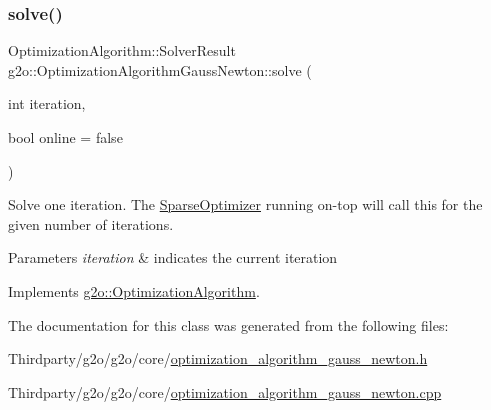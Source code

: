\subsubsection{\texorpdfstring{solve()}{solve()}}
{\footnotesize\ttfamily Optimization\+Algorithm\+::\+Solver\+Result g2o\+::\+Optimization\+Algorithm\+Gauss\+Newton\+::solve (\begin{DoxyParamCaption}\item[{int}]{iteration,  }\item[{bool}]{online = {\ttfamily false} }\end{DoxyParamCaption})\hspace{0.3cm}{\ttfamily [virtual]}}

Solve one iteration. The \mbox{\hyperlink{classg2o_1_1_sparse_optimizer}{Sparse\+Optimizer}} running on-\/top will call this for the given number of iterations. 
\begin{DoxyParams}{Parameters}
{\em iteration} & indicates the current iteration \\
\hline
\end{DoxyParams}


Implements \mbox{\hyperlink{classg2o_1_1_optimization_algorithm_ab174deeeb2551ceaf715ea09f0f9c077}{g2o\+::\+Optimization\+Algorithm}}.



The documentation for this class was generated from the following files\+:\begin{DoxyCompactItemize}
\item 
Thirdparty/g2o/g2o/core/\mbox{\hyperlink{optimization__algorithm__gauss__newton_8h}{optimization\+\_\+algorithm\+\_\+gauss\+\_\+newton.\+h}}\item 
Thirdparty/g2o/g2o/core/\mbox{\hyperlink{optimization__algorithm__gauss__newton_8cpp}{optimization\+\_\+algorithm\+\_\+gauss\+\_\+newton.\+cpp}}\end{DoxyCompactItemize}
